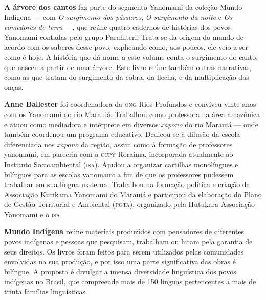 \textbf{A árvore dos cantos} faz parte do segmento Yanomami da coleção Mundo Indígena --- com \textit{O surgimento dos pássaros}, \textit{O surgimento da noite} e \textit{Os comedores de terra} ---, que reúne quatro cadernos de histórias dos povos Yanomami contadas pelo grupo Parahiteri. Trata-se da origem do mundo de acordo com os saberes desse povo, explicando como, aos poucos, ele veio a ser como é hoje. A história que dá nome a este volume conta o surgimento do canto, que nasceu a partir de uma árvore. Este livro reúne também outras narrativas, como as que tratam do surgimento da cobra, da flecha, e da multiplicação das onças.

\textbf{Anne Ballester} foi coordenadora da \textsc{ong} Rios Profundos e conviveu vinte anos com os Yanomami do rio Marauiá. Trabalhou como professora na área amazônica e atuou como mediadora e intérprete em diversos \textit{xapono} do rio Marauiá --- onde também coordenou um programa educativo. Dedicou-se à difusão da escola diferenciada nos \textit{xapono} da região, assim como à formação de professores yanomami, em parceria com a \textsc{ccpy} Roraima, incorporada atualmente ao Instituto Socioambiental (\textsc{isa}). Ajudou a organizar cartilhas monolíngues e bilíngues para as escolas yanomami a fim de que os professores pudessem trabalhar em sua língua materna. Trabalhou na formação política e criação da Associação Kurikama Yanomami do Marauiá e participou da elaboração do Plano de Gestão Territorial e Ambiental (\textsc{pgta}), organizado pela Hutukara Associação Yanomami e o \textsc{isa}.

\textbf{Mundo Indígena} reúne materiais produzidos com pensadores de diferentes povos indígenas e pessoas que pesquisam, trabalham ou lutam pela garantia de seus direitos. Os livros foram feitos para serem utilizados pelas comunidades envolvidas na sua produção, e por isso uma parte significativa das obras é bilíngue. A proposta é divulgar a imensa diversidade linguística dos povos indígenas no Brasil, que compreende mais de 150 línguas pertencentes a mais de trinta famílias linguísticas.\par



